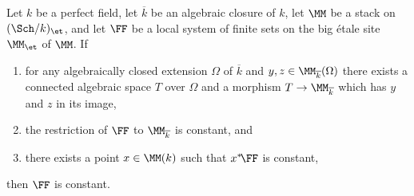 \begin{lemma}\label{lem:local_system_constant}
    Let $k$ be a perfect field, let $\overline{k}$ be an algebraic closure of $k$, let $\MM$ be a stack on $(\Sch/k)_{\et}$, and let $\FF$ be a local system of finite sets on the big \'etale site $\MM_{\et}$ of $\MM$. If
\begin{enumerate}
    \item for any algebraically closed extension $\Omega$ of $\overline{k}$ and $y, z \in \MM_{\overline{k}}(\Omega)$ there exists a connected algebraic space $T$ over $\Omega$ and a morphism $T \rightarrow \MM_{\overline{k}}$ which has $y$ and $z$ in its image,
\item the restriction of $\FF$ to $\MM_{\overline{k}}$ is constant, and
\item there exists a point $x \in \MM(k)$ such that $x^*\! \FF$ is constant,
\end{enumerate}
then $\FF$ is constant.
\end{lemma}
